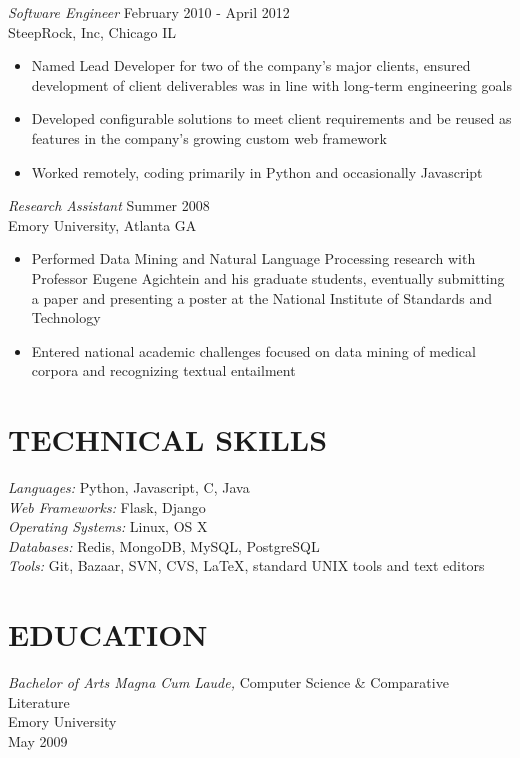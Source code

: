 \documentclass[line,margin]{res}
\begin{document}
\begin{resume}
        {\sl Software Engineer} \hfill February 2010 - April 2012 \\
        SteepRock, Inc, Chicago IL
        \begin{itemize}
        \item Named Lead Developer for two of the company's major
          clients, ensured development of client
          deliverables was in line with long-term engineering goals
        \item Developed configurable solutions to meet client
          requirements and be reused as features in the company's
          growing custom web framework
        \item Worked remotely, coding primarily in Python and
          occasionally Javascript
        \end{itemize}

        {\sl Research Assistant} \hfill Summer 2008 \\
        Emory University, Atlanta GA
        \begin{itemize}
        \item Performed Data Mining and Natural Language Processing research
          with Professor Eugene Agichtein and his graduate students,
          eventually submitting a paper and presenting a poster at the National
          Institute of Standards and Technology
        \item Entered national academic challenges focused on data
          mining of medical corpora and recognizing textual entailment
        \end{itemize}

\section{TECHNICAL SKILLS}
        {\sl Languages:} Python, Javascript, C, Java \\
        {\sl Web Frameworks:} Flask, Django \\
        {\sl Operating Systems:} Linux, OS X\\
        {\sl Databases:} Redis, MongoDB, MySQL, PostgreSQL \\
        {\sl Tools:} Git, Bazaar, SVN, CVS, \LaTeX, standard UNIX tools and
        text editors

\section{EDUCATION}
        {\sl Bachelor of Arts Magna Cum Laude,}
        Computer Science \& Comparative Literature \\
        Emory University \\
        May 2009


\end{resume}
\end{document}
